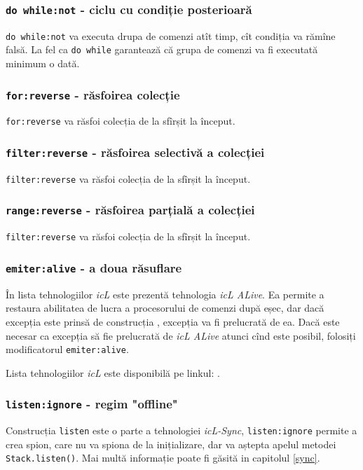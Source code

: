 \subsubsection{\lstinline|do while:not| - ciclu cu condiție posterioară}

\lstinline|do while:not| va executa drupa de comenzi atît timp, cît condiția va rămîne falsă. La fel ca \lstinline|do while| garantează că grupa de comenzi va fi executată minimum o dată.

\subsubsection{\lstinline|for:reverse| - răsfoirea colecție}

\lstinline|for:reverse| va răsfoi colecția de la sfîrșit la început.

\subsubsection{\lstinline|filter:reverse| - răsfoirea selectivă a colecției}

\lstinline|filter:reverse| va răsfoi colecția de la sfîrșit la început.

\subsubsection{\lstinline|range:reverse| - răsfoirea parțială a colecției}

\lstinline|filter:reverse| va răsfoi colecția de la sfîrșit la început.

\subsubsection{\lstinline|emiter:alive| - a doua răsuflare}

În lista tehnologiilor \textit{icL} este prezentă tehnologia \textit{icL ALive}. Ea permite a restaura abilitatea de lucra a procesorului de comenzi după eșec, dar dacă excepția este prinsă de construcția , excepția va fi prelucrată de ea. Dacă este necesar ca excepția să fie prelucrată de \textit{icL ALive} atunci cînd este posibil, folosiți modificatorul \lstinline|emiter:alive|.

Lista tehnologiilor \textit{icL} este disponibilă pe linkul: .

\subsubsection{\lstinline|listen:ignore| - regim "offline"}

Construcția \lstinline|listen| este o parte a tehnologiei \textit{icL-Sync}, \lstinline|listen:ignore| permite a crea spion, care nu va spiona de la inițializare, dar va aștepta apelul metodei \lstinline|Stack.listen()|. Mai multă informație poate fi găsită in capitolul \ref{sync}.